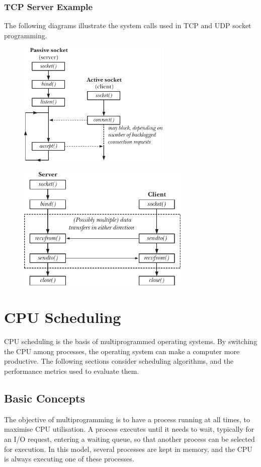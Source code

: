 \documentclass{article}
\begin{document}
\subsubsection{TCP Server Example}
The following diagrams illustrate the system calls used in TCP and UDP
socket programming.
\begin{figure}[H]
    \centering
    \includegraphics[height = 6cm]{figures/sockets_TCP.pdf}
\end{figure}
\begin{figure}[H]
    \centering
    \includegraphics[height = 6cm]{figures/sockets_UDP.pdf}
\end{figure}
\section{CPU Scheduling}
CPU scheduling is the basis of multiprogrammed operating systems. By
switching the CPU among processes, the operating system can make a
computer more productive. The following sections consider scheduling
algorithms, and the performance metrics used to evaluate them.
\subsection{Basic Concepts}
The objective of multiprogramming is to have a process running at all
times, to maximise CPU utilisation. A process executes until it needs
to wait, typically for an I/O request, entering a waiting queue, so
that another process can be selected for execution. In this model,
several processes are kept in memory, and the CPU is always executing
one of these processes.
\end{document}
